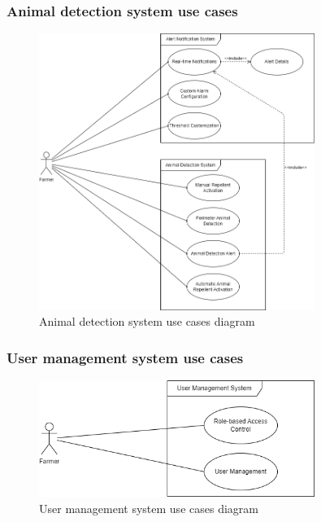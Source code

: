 \subsubsection*{Animal detection system use cases}
\begin{figure}[H]
    \centering
    \includegraphics[width=0.8\textwidth]{./images/6/alert_animal_uses.png}
    \caption{Animal detection system use cases diagram}
\end{figure}

\subsubsection*{User management system use cases}
\begin{figure}[H]
    \centering
    \includegraphics[width=0.8\textwidth]{./images/6/user_management_uses.png}
    \caption{User management system use cases diagram}
\end{figure}

